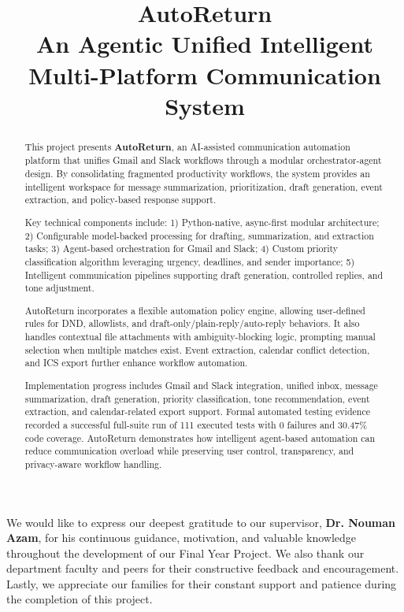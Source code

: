 \documentclass{fast-nuces-bs}
\title{AutoReturn \\ \large An Agentic Unified Intelligent Multi-Platform Communication System}
\begin{document}
\begin{acknowledgements}
We would like to express our deepest gratitude to our supervisor, \textbf{Dr. Nouman Azam}, for his continuous guidance, motivation, and valuable knowledge throughout the development of our Final Year Project. We also thank our department faculty and peers for their constructive feedback and encouragement. Lastly, we appreciate our families for their constant support and patience during the completion of this project.
\end{acknowledgements}

\begin{abstract}
This project presents \textbf{AutoReturn}, an AI-assisted communication automation platform that unifies Gmail and Slack workflows through a modular orchestrator-agent design. By consolidating fragmented productivity workflows, the system provides an intelligent workspace for message summarization, prioritization, draft generation, event extraction, and policy-based response support.

Key technical components include: 
1) Python-native, async-first modular architecture; 
2) Configurable model-backed processing for drafting, summarization, and extraction tasks; 
3) Agent-based orchestration for Gmail and Slack; 
4) Custom priority classification algorithm leveraging urgency, deadlines, and sender importance; 
5) Intelligent communication pipelines supporting draft generation, controlled replies, and tone adjustment.  

AutoReturn incorporates a flexible automation policy engine, allowing user-defined rules for DND, allowlists, and draft-only/plain-reply/auto-reply behaviors. It also handles contextual file attachments with ambiguity-blocking logic, prompting manual selection when multiple matches exist. Event extraction, calendar conflict detection, and ICS export further enhance workflow automation.

Implementation progress includes Gmail and Slack integration, unified inbox, message summarization, draft generation, priority classification, tone recommendation, event extraction, and calendar-related export support. Formal automated testing evidence recorded a successful full-suite run of 111 executed tests with 0 failures and 30.47\% code coverage. AutoReturn demonstrates how intelligent agent-based automation can reduce communication overload while preserving user control, transparency, and privacy-aware workflow handling.
\end{abstract}
\end{document}
